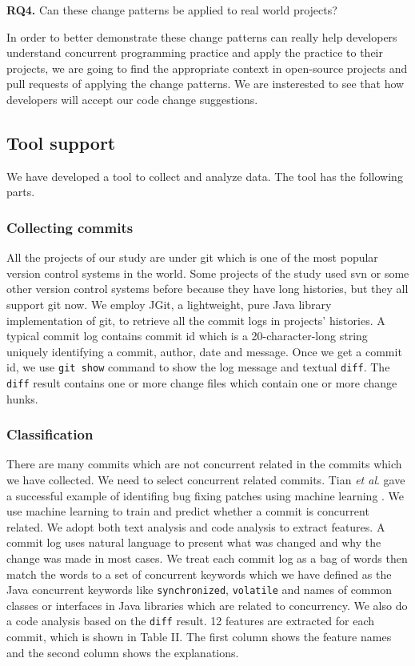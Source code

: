 \documentclass[conference]{IEEEtran}
\begin{document}
\textbf{RQ4.} Can these change patterns be applied to real world projects?

In order to better demonstrate these change patterns can really help developers understand concurrent programming practice and apply the practice to their projects, we are going to find the appropriate context in open-source projects and pull requests of applying the change patterns. We are insterested to see that how developers will accept our code change suggestions.

\subsection{Tool support}
We have developed a tool to collect and analyze data. The tool has the following parts.

\subsubsection{Collecting commits}
All the projects of our study are under git which is one of the most popular version control systems in the world. Some projects of the study used svn or some other version control systems before because they have long histories, but they all support git \cite{books/daglib/0022839} now. We employ JGit, a lightweight, pure Java library implementation of git, to retrieve all the commit logs in projects' histories. A typical commit log contains commit id which is a 20-character-long string uniquely identifying a commit, author, date and message. Once we get a commit id, we use \texttt{git show} command to show the log message and textual \texttt{diff}. The \texttt{diff} result contains one or more change files which contain one or more change hunks.

\subsubsection{Classification}
There are many commits which are not concurrent related in the commits which we have collected.  We need to select concurrent related commits. Tian \textit{et al}. gave a successful example of identifing bug fixing patches using machine learning \cite{conf/icse/TianLL12}. We use machine learning to train and predict whether a commit is concurrent related. We adopt both text analysis and code analysis to extract features. A commit log uses natural language to present what was changed and why the change was made in most cases. We treat each commit log as a bag of words then match the words to a set of concurrent keywords which we have defined as the Java concurrent keywords like \texttt{synchronized}, \texttt{volatile} and names of common classes or interfaces in Java libraries which are related to concurrency. We also do a code analysis based on the \texttt{diff} result. 12 features are extracted for each commit, which is shown in Table II. The first column shows the feature names and the second column shows the explanations.
\end{document}

